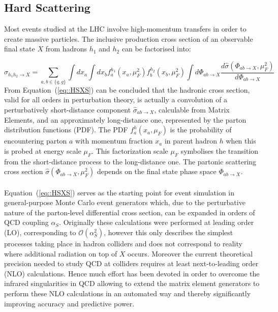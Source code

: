 \subsection{Hard Scattering} \label{sec::HardScattering}
Most events studied at the LHC involve high-momentum transfers in order to create massive particles. The inclusive production cross section of an observable final state $X$ from hadrons $h_1$ and $h_2$ can be factorised into:

\begin{equation} \label{eq::HSXS}
 \sigma_{h_{1}h_{2} \rightarrow X} =\sum_{a,b \in \{q,g\} } \int dx_{a} \int dx_{b} f_{a}^{h_{1}}(x_{a},\mu^{2}_{F}) f_{b}^{h_{2}}(x_{b},\mu^{2}_{F}) \int d\Phi_{ab \rightarrow X} \dfrac{d\hat{\sigma}(\Phi_{ab \rightarrow X},\mu^{2}_{F})}{d\Phi_{ab \rightarrow X}}
\end{equation}
From Equation~(\ref{eq::HSXS}) can be concluded that the hadronic cross section, valid for all orders in perturbation theory, is actually a convolution of a perturbatively short-distance component $\hat{\sigma}_{ab \rightarrow X}$, calculable from Matrix Elements, and an approximately long-distance one, represented by the parton distribution functions (PDF). The PDF $f_{a}^{h}(x_{a},\mu_{F})$ is the probability of encountering parton $a$ with momentum fraction $x_a$ in parent hadron $h$ when this is probed at energy scale $\mu_{F}$. This factorization scale $\mu_{F}$ symbolises the transition from the short-distance process to the long-distance one. 
The partonic scattering cross section $\hat{\sigma}(\Phi_{ab \rightarrow X},\mu^{2}_{F})$ depends on the final state phase space $\Phi_{ab \rightarrow X}$. 
\\
\\
Equation~(\ref{eq::HSXS}) serves as the starting point for event simulation in general-purpose Monte Carlo event generators which, due to the perturbative nature of the parton-level differential cross section, can be expanded in orders of QCD coupling $\alpha_{S}$. Originally these calculations were performed at leading order (LO), corresponding to $\mathcal{O}(\alpha_{S}^{2})$, however this only describes the simplest processes taking place in hadron colliders and does not correspond to reality where additional radiation on top of $X$ occurs. Moreover the current theoretical precision needed to study QCD at colliders requires at least next-to-leading order (NLO) calculations. Hence much effort has been devoted in order to overcome the infrared singularities in QCD allowing to extend the matrix element generators to perform these NLO calculations in an automated way and thereby significantly improving accuracy and predictive power.
